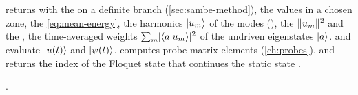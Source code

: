 \begin{incode}
 returns  with the  on a definite
branch (\cref{sec:sambe-method}), the  values in a chosen zone, the
 \eqref{eq:mean-energy}, the harmonics $\lvert u_m\rangle$ of the modes
(), the  $\lVert u_m\rVert^2$ and the ,
the time-averaged weights $\sum_m\lvert \langle a\vert u_m\rangle\rvert^2$ of the undriven eigenstates
$\lvert a\rangle$.  and  evaluate $\lvert u(t)\rangle$ and $\lvert \psi(t)\rangle$.
 computes probe matrix elements (\cref{ch:probes}), and
 returns the index of the Floquet state that continues the
static state .
\par\smallskip{}.
\end{incode}
